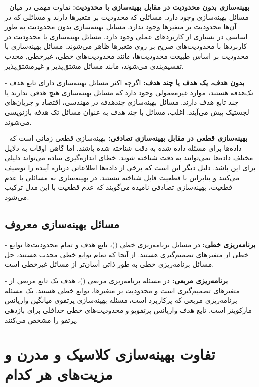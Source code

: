 - \textbf{
	بهینه‌سازی بدون محدودیت در مقابل بهینه‌سازی با محدودیت:
}
تفاوت مهمی در میان مسائل بهینه‌سازی وجود دارد. مسائلی که محدودیت‌ بر متغیرها دارند و مسائلی که در آن‌ها محدودیت‌ بر متغیرها وجود ندارد. مسائل بهینه‌سازی بدون محدودیت به طور اساسی در بسیاری از کاربردهای عملی وجود دارد. مسائل بهینه‌سازی با محدودیت در کاربردها با محدودیت‌های صریح بر روی متغیرها ظاهر می‌شوند. مسائل بهینه‌سازی با محدودیت بر اساس طبیعت محدودیت‌ها، مانند محدودیت‌های خطی، غیرخطی, محدب تقسیم‌بندی می‌شوند، مانند مسائل مشتق‌پذیر و غیرمشتق‌پذیر.

- \textbf{
	بدون هدف، یک هدف یا چند هدف:
}
اگرچه اکثر مسائل بهینه‌سازی دارای تابع هدف تک‌هدفه هستند، موارد غیرمعمولی وجود دارد که مسائل بهینه‌سازی هیچ هدفی ندارند یا چند تابع هدف دارند. مسائل بهینه‌سازی چند‌هدفه در مهندسی، اقتصاد و جریان‌های لجستیک پیش می‌آیند. اغلب، مسائل با چند هدف به عنوان مسائل تک هدفه بازنویسی می‌شوند.

- \textbf{
	بهینه‌سازی قطعی در مقابل بهینه‌سازی تصادفی:
}
بهینه‌سازی قطعی زمانی است که داده‌ها برای مسئله داده شده به دقت شناخته شده باشند. اما گاهی اوقات به دلایل مختلف داده‌ها نمی‌توانند به دقت شناخته شوند. خطای اندازه‌گیری ساده می‌تواند دلیلی برای این باشد. دلیل دیگر این است که برخی از داده‌ها اطلاعاتی درباره آینده را توصیف می‌کنند و بنابراین با قطعیت قابل شناخته نیستند. در بهینه‌سازی به مسائلی با عدم قطعیت، بهینه‌سازی تصادفی نامیده می‌گویند که عدم قطعیت با این مدل ترکیب می‌شود.

\subsection{مسائل بهینه‌سازی معروف}

- \textbf{
	برنامه‌ریزی خطی:
}
در مسائل برنامه‌ریزی خطی ()، تابع هدف و تمام محدودیت‌ها توابع خطی از متغیرهای تصمیم‌گیری هستند.
از آنجا که تمام توابع خطی محدب هستند، حل مسائل برنامه‌ریزی خطی به طور ذاتی آسان‌تر از مسائل غیرخطی است.

- \textbf{برنامه‌ریزی مربعی:}
در مسئله برنامه‌ریزی مربعی ()، هدف یک تابع مربعی از متغیرهای تصمیم‌گیری است و محدودیت‌ بر متغیرها، توابع خطی هستند.
یک مسئله برنامه‌ریزی مربعی که پرکاربرد است، مسئله بهینه‌سازی پرتفوی میانگین-واریانس مارکویتز است. تابع هدف واریانس پرتفویو و محدودیت‌های خطی حداقلی برای بازدهی پرتفو را مشخص می‌کنند.
\section{تفاوت بهینه‌سازی کلاسیک و مدرن و مزیت‌های هر کدام}

